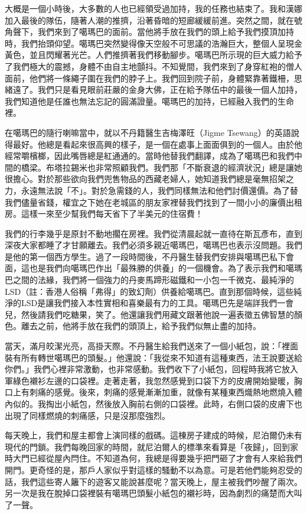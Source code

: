 大概是一個小時後，大多數的人也已經領受過加持，我的任務也結束了。我和漢娜加入最後的隊伍，隨著人潮的推擠，沿著昏暗的短廊緩緩前進。突然之間，就在號角聲下，我們來到了噶瑪巴的面前。當他將手放在我們的頭上給予我們摸頂加持時，我們抬頭仰望。噶瑪巴突然變得像天空般不可思議的浩瀚巨大，整個人呈現金黃色，並且閃耀著光芒。人們推擠著我們移動腳步。噶瑪巴所示現的巨大威力給予了我們極大的震撼，身體不由自主地顫抖。不知覺間，我們來到了身穿紅袍的僧人面前，他們將一條繩子圍在我們的脖子上。我們回到院子前，身體緊靠著鐵柵，思緒遠了。我們只是看見眼前莊嚴的金身大佛，正在給予隊伍中的最後一個人加持，我們知道他是任誰也無法忘記的圓滿證量。噶瑪巴的加持，已經融入我們的生命裡。

在噶瑪巴的隨行喇嘛當中，就以不丹籍醫生吉梅澤旺（Jigme
Tsewang）的英語說得最好。他總是看起來很高興的樣子，是一個在處事上面面俱到的一個人。由於他經常嚼檳榔，因此嘴唇總是紅通通的。當時他替我們翻譯，成為了噶瑪巴和我們中間的橋梁。布塔拉錫米也非常照顧我們。我們那「不斷衰退的經濟狀況」總是讓她很擔心。對於那些欲向我們兜售物品的西藏老婦人，她知道我們總是毫無招架之力，永遠無法說「不」。對於急需錢的人，我們同樣無法和他們討價還價。為了替我們儘量省錢，權宜之下她在老城區的朋友家裡替我們找到了一間小小的廉價出租房。這樣一來至少幫我們每天省下了半美元的住宿費！

我們的行李幾乎是原封不動地擱在房裡。我們從清晨起就一直待在斯瓦彥布，直到深夜大家都睡了才甘願離去。我們必須多親近噶瑪巴，噶瑪巴也表示沒問題。我們是他的第一個西方學生。過了一段時間後，不丹醫生替我們安排與噶瑪巴私下會面，這也是我們向噶瑪巴作出「最殊勝的供養」的一個機會。為了表示我們和噶瑪巴之間的法緣，我們將一個強力的丹麥馬蹄形磁鐵和一小包一千微克、最純淨的LSD（註：香港人俗稱「弗得」的致幻劑）供養給噶瑪巴。直到那個時候，這些純淨的LSD是讓我們接入本性實相和喜樂最有力的工具。噶瑪巴先是端詳我們一會兒，然後請我們吃糖果，笑了。他還讓我們用藏文跟著他說一遍表徵五佛智慧的顏色。離去之前，他將手放在我們的頭頂上，給予我們似無止盡的加持。

當天，滿月皎潔光亮，高掛天際。不丹醫生給我們送來了一個小紙包，說：「裡面裝有所有轉世噶瑪巴的頭髮。」他還說：「我從來不知道有這種東西，法王說要送給你們。」我們心裡非常激動，也非常感動。我們收下了小紙包，回程時我將它放入軍綠色襯衫左邊的口袋裡。走著走著，我忽然感覺到口袋下方的皮膚開始變暖，胸口上有刺痛的感覺。後來，刺痛的感覺漸漸加重，就像有某種東西熾熱地燃燒入體內似的。我掏出小紙包，然後放入胸前右側的口袋裡。此時，右側口袋的皮膚下也出現了同樣燃燒的刺痛感，只是沒那麼強烈。

每天晚上，我們和屋主都會上演同樣的戲碼。這棟房子建成的時候，尼泊爾仍未有現代的門鎖。我們每晚回家的時間，就尼泊爾人的標準來看算是「夜歸」，回到家時大門已經從屋內閂住。不知道為何，我總是得要幾乎把門砸了才會有人來給我們開門。更奇怪的是，那戶人家似乎對這樣的騷動不以為意。可是若他們能夠忍受的話，我們這些寄人籬下的遊客又能說甚麼呢？當天晚上，屋主被我們吵醒了兩次。另一次是我在脫掉口袋裡裝有噶瑪巴頭髮小紙包的襯衫時，因為劇烈的痛楚而大叫了一聲。

